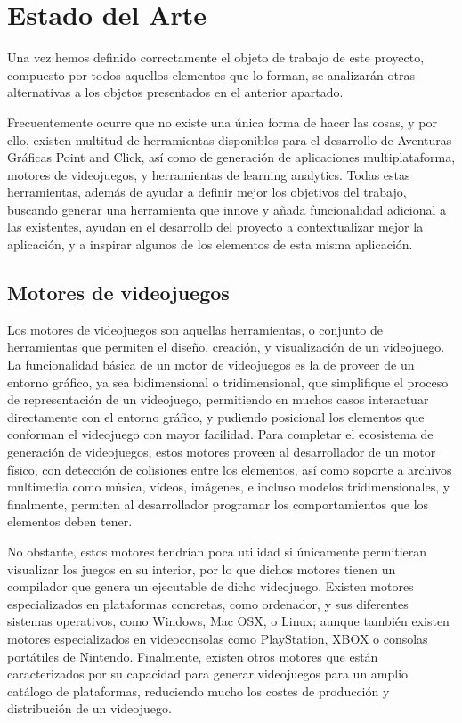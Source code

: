 \section{Estado del Arte}
\label{estadodelarte}

Una vez hemos definido correctamente el objeto de trabajo de este proyecto, compuesto por todos aquellos elementos que lo forman, se analizarán otras alternativas a los objetos presentados en el anterior apartado. 

Frecuentemente ocurre que no existe una única forma de hacer las cosas, y por ello, existen multitud de herramientas disponibles para el desarrollo de Aventuras Gráficas Point and Click, así como de generación de aplicaciones multiplataforma, motores de videojuegos, y herramientas de learning analytics. Todas estas herramientas, además de ayudar a definir mejor los objetivos del trabajo, buscando generar una herramienta que innove y añada funcionalidad adicional a las existentes, ayudan en el desarrollo del proyecto a contextualizar mejor la aplicación, y a inspirar algunos de los elementos de esta misma aplicación.

\subsection{Motores de videojuegos}
\label{motoresdevideojuegos}

Los motores de videojuegos son aquellas herramientas, o conjunto de herramientas que permiten el diseño, creación, y visualización de un videojuego. La funcionalidad básica de un motor de videojuegos es la de proveer de un entorno gráfico, ya sea bidimensional o tridimensional, que simplifique el proceso de representación de un videojuego, permitiendo en muchos casos interactuar directamente con el entorno gráfico, y pudiendo posicional los elementos que conforman el videojuego con mayor facilidad. Para completar el ecosistema de generación de videojuegos, estos motores proveen al desarrollador de un motor físico, con detección de colisiones entre los elementos, así como soporte a archivos multimedia como música, vídeos, imágenes, e incluso modelos tridimensionales, y finalmente, permiten al desarrollador programar los comportamientos que los elementos deben tener.

No obstante, estos motores tendrían poca utilidad si únicamente permitieran visualizar los juegos en su interior, por lo que dichos motores tienen un compilador que genera un ejecutable de dicho videojuego. Existen motores especializados en plataformas concretas, como ordenador, y sus diferentes sistemas operativos, como Windows, Mac OSX, o Linux; aunque también existen motores especializados en videoconsolas como PlayStation, XBOX o consolas portátiles de Nintendo. Finalmente, existen otros motores que están caracterizados por su capacidad para generar videojuegos para un amplio catálogo de plataformas, reduciendo mucho los costes de producción y distribución de un videojuego.

